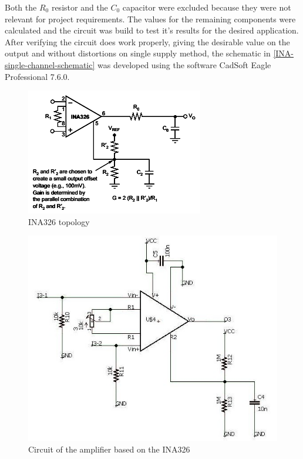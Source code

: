 Both the $R_0$ resistor and the $C_0$ capacitor were excluded because they were not
relevant for project requirements. The values for the remaining components were calculated
and the circuit was build to test it's results for the desired application.
After verifying the circuit does work properly, giving the desirable value on the output and without
distortions on single supply method, the schematic in \autoref{INA-single-channel-schematic} was
developed using the software CadSoft Eagle Professional 7.6.0.
\begin{figure}[!htpb]
  \centering
  \caption{INA326 topology}
  \label{INA_topology}
  \includegraphics[scale=0.7]{images/INA/datasheet}
\end{figure}

\begin{figure}[!htpb]
  \centering
  \caption{Circuit of the amplifier based on the INA326}
  \label{INA-single-channel-schematic}
  \includegraphics[scale=0.65]{images/INA/single-channel-schematic}
\end{figure}


